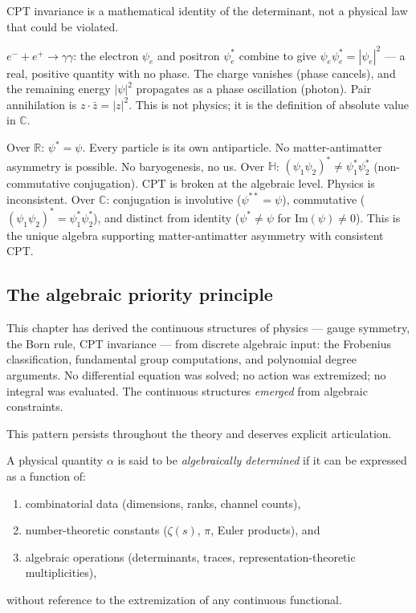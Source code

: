 CPT invariance is a mathematical identity of the determinant, not a physical law that could be violated.

\begin{remark}[Pair annihilation is $\psi\psi^* = |\psi|^2$]
$e^- + e^+ \to \gamma\gamma$: the electron $\psi_e$ and positron $\psi^*_e$ combine to give $\psi_e \psi^*_e = |\psi_e|^2$ --- a real, positive quantity with no phase. The charge vanishes (phase cancels), and the remaining energy $|\psi|^2$ propagates as a phase oscillation (photon). Pair annihilation is $z \cdot \bar{z} = |z|^2$. This is not physics; it is the definition of absolute value in $\mathbb{C}$.
\end{remark}

\begin{remark}
Over $\mathbb{R}$: $\psi^* = \psi$. Every particle is its own antiparticle. No matter-antimatter asymmetry is possible. No baryogenesis, no us.
Over $\mathbb{H}$: $(\psi_1 \psi_2)^* \neq \psi^*_1 \psi^*_2$ (non-commutative conjugation). CPT is broken at the algebraic level. Physics is inconsistent.
Over $\mathbb{C}$: conjugation is involutive ($\psi^{**} = \psi$), commutative ($(\psi_1\psi_2)^* = \psi^*_1\psi^*_2$), and distinct from identity ($\psi^* \neq \psi$ for $\text{Im}(\psi) \neq 0$). This is the unique algebra supporting matter-antimatter asymmetry with consistent CPT.
\end{remark}

\subsection{The algebraic priority principle}
\label{sec:algebraic_priority}

This chapter has derived the continuous structures of physics --- gauge symmetry, the Born rule, CPT invariance --- from discrete algebraic input: the Frobenius classification, fundamental group computations, and polynomial degree arguments. No differential equation was solved; no action was extremized; no integral was evaluated. The continuous structures \emph{emerged} from algebraic constraints.

This pattern persists throughout the theory and deserves explicit articulation.

\begin{definition}
\label{def:algebraic_priority}
A physical quantity $\alpha$ is said to be \emph{algebraically determined} if it can be expressed as a function of:
\begin{enumerate}
\item combinatorial data (dimensions, ranks, channel counts),
\item number-theoretic constants ($\zeta(s)$, $\pi$, Euler products), and
\item algebraic operations (determinants, traces, representation-theoretic multiplicities),
\end{enumerate}
without reference to the extremization of any continuous functional.
\end{definition}

